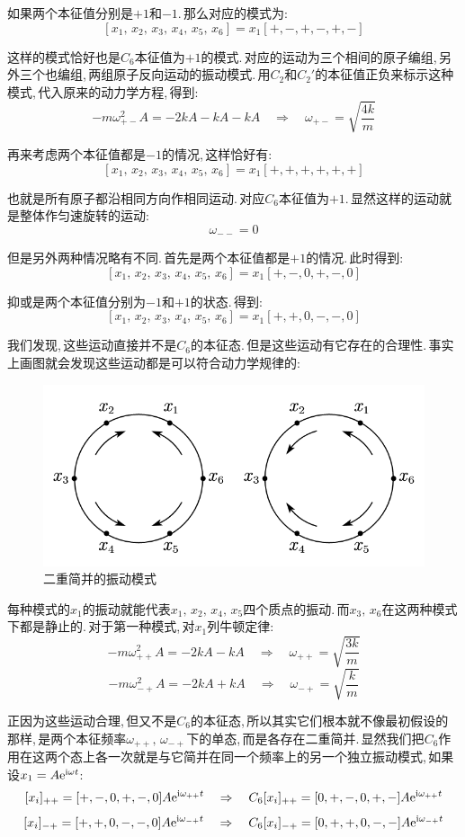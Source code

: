 如果两个本征值分别是$+1$和$-1$.\,那么对应的模式为:
\[[x_1,\,x_2,\,x_3,\,x_4,\,x_5,\,x_6]=x_1[+,-,+,-,+,-]\]

这样的模式恰好也是$C_6$本征值为$+1$的模式.\,对应的运动为三个相间的原子编组,\,另外三个也编组,\,两组原子反向运动的振动模式.\,用$C_2$和$C_2'$的本征值正负来标示这种模式,\,代入原来的动力学方程,\,得到:
\[-m\omega_{+-}^2A=-2kA-kA-kA\quad\Rightarrow\quad \omega_{+-}=\sqrt{\frac{4k}{m}}\]

再来考虑两个本征值都是$-1$的情况,\,这样恰好有:
\[[x_1,\,x_2,\,x_3,\,x_4,\,x_5,\,x_6]=x_1[+,+,+,+,+,+]\]

也就是所有原子都沿相同方向作相同运动.\,对应$C_6$本征值为$+1$.\,显然这样的运动就是整体作匀速旋转的运动:
\[\omega_{--}=0\]

但是另外两种情况略有不同.\,首先是两个本征值都是$+1$的情况.\,此时得到:
\[[x_1,\,x_2,\,x_3,\,x_4,\,x_5,\,x_6]=x_1[+,-,0,+,-,0]\]

抑或是两个本征值分别为$-1$和$+1$的状态.\,得到:
\[[x_1,\,x_2,\,x_3,\,x_4,\,x_5,\,x_6]=x_1[+,+,0,-,-,0]\]

我们发现,\,这些运动直接并不是$C_6$的本征态.\,但是这些运动有它存在的合理性.\,事实上画图就会发现这些运动都是可以符合动力学规律的:

\begin{figure}[H]
\centering
\includegraphics[width=12cm]{image/6-3-12.png}
\caption{二重简并的振动模式}
\end{figure}

每种模式的$x_1$的振动就能代表$x_1,\,x_2,\,x_4,\,x_5$四个质点的振动.\,而$x_3,\,x_6$在这两种模式下都是静止的.\,对于第一种模式,\,对$x_1$列牛顿定律:
\[-m\omega_{++}^2A=-2kA-kA\quad\Rightarrow \quad \omega_{++}=\sqrt{\frac{3k}{m}}\]
\[-m\omega_{-+}^2A=-2kA+kA\quad\Rightarrow \quad \omega_{-+}=\sqrt{\frac{k}{m}}\]

正因为这些运动合理,\,但又不是$C_6$的本征态,\,所以其实它们根本就不像最初假设的那样,\,是两个本征频率$\omega_{++},\,\omega_{-+}$下的单态,\,而是各存在二重简并.\,显然我们把$C_6$作用在这两个态上各一次就是与它简并在同一个频率上的另一个独立振动模式,\,如果设$x_1=A{\rm e}^{{\rm i}\omega t}$:
\[[x_i]_{++}=[+,-,0,+,-,0]A{\rm e}^{{\rm i}\omega_{++} t}\quad\Rightarrow\quad C_6[x_i]_{++}=[0,+,-,0,+,-]A{\rm e}^{{\rm i}\omega_{++} t}\]
\[[x_i]_{-+}=[+,+,0,-,-,0]A{\rm e}^{{\rm i}\omega_{-+} t}\quad\Rightarrow\quad C_6[x_i]_{-+}=[0,+,+,0,-,-]A{\rm e}^{{\rm i}\omega_{-+} t}\]

